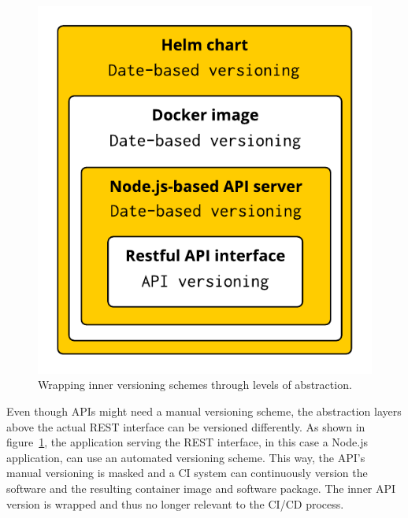 \begin{figure}[H]
\begin{center}
  \includegraphics[scale=0.7]{images/figures/version_wrapping.pdf}
\end{center}
\caption{Wrapping inner versioning schemes through levels of abstraction.}%
\label{fig:version_wrapping}
\end{figure}

Even though \acp{API} might need a manual versioning scheme, the abstraction
layers above the actual \ac{REST} interface can be versioned differently. As
shown in figure~\ref{fig:version_wrapping}, the application serving the
\ac{REST} interface, in this case a Node.js application, can use an automated
versioning scheme. This way, the \ac{API}'s manual versioning is masked and a
\ac{CI} system can continuously version the software and the resulting
container image and software package. The inner \ac{API} version is wrapped and
thus no longer relevant to the \ac{CI}/\ac{CD} process.



